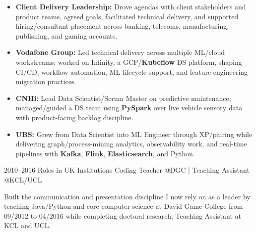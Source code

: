 \documentclass[]{../../../../friggeri-cv}
\begin{document}
\begin{entrylist}
{{        }
        \begin{itemize}[leftmargin=1.1em]
					            \item \footnotesize\textbf{Client Delivery Leadership:} Drove agendas with client stakeholders and product teams, agreed goals, facilitated technical delivery, and supported hiring/consultant placement across banking, telecoms, manufacturing, publishing, and gaming accounts.
					            \item \footnotesize\textbf{Vodafone Group:} Led technical delivery across multiple ML/cloud workstreams; worked on Infinity, a GCP/\textbf{Kubeflow} DS platform, shaping CI/CD, workflow automation, ML lifecycle support, and feature-engineering migration practices.
				            \item \footnotesize\textbf{CNHi:} Lead Data Scientist/Scrum Master on predictive maintenance; managed/guided a DS team using \textbf{PySpark} over live vehicle sensory data with product-facing backlog discipline.
			            \item \footnotesize\textbf{UBS:} Grew from Data Scientist into ML Engineer through XP/pairing while delivering graph/process-mining analytics, observability work, and real-time pipelines with \textbf{Kafka}, \textbf{Flink}, \textbf{Elasticsearch}, and Python.
	        \end{itemize}
    }
    \entry
    {2010–2016}
    {Roles in UK Institutions}
    {\small Coding Teacher @DGC | Teaching Assistant @KCL/UCL}
    {
        {\small
        \setlength{\parindent}{0pt}
        \setlength{\leftskip}{0pt}
	        Built the communication and presentation discipline I now rely on as a leader by teaching Java/Python and core computer science at David Game College from 09/2012 to 04/2016 while completing doctoral research; Teaching Assistant at KCL and UCL.

	        }
	    }
	\end{entrylist}
	\newpage
	\setlength{\parskip}{2pt}
	\setlength{\parsep}{0pt}
\end{document}
